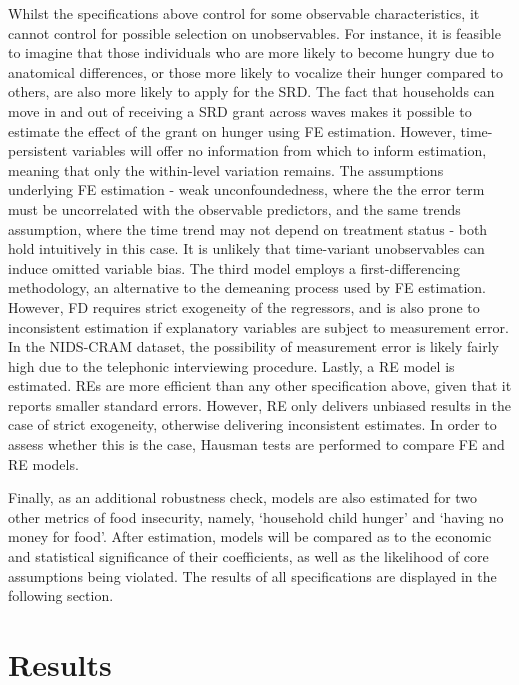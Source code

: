 \documentclass[11pt,preprint, authoryear]{elsarticle}
\numberwithin{equation}{section}
\numberwithin{figure}{section}
\numberwithin{table}{section}
\begin{document}
Whilst the specifications above control for some observable
characteristics, it cannot control for possible selection on
unobservables. For instance, it is feasible to imagine that those
individuals who are more likely to become hungry due to anatomical
differences, or those more likely to vocalize their hunger compared to
others, are also more likely to apply for the SRD. The fact that
households can move in and out of receiving a SRD grant across waves
makes it possible to estimate the effect of the grant on hunger using FE
estimation. However, time-persistent variables will offer no information
from which to inform estimation, meaning that only the within-level
variation remains. The assumptions underlying FE estimation - weak
unconfoundedness, where the the error term must be uncorrelated with the
observable predictors, and the same trends assumption, where the time
trend may not depend on treatment status - both hold intuitively in this
case. It is unlikely that time-variant unobservables can induce omitted
variable bias. The third model employs a first-differencing methodology,
an alternative to the demeaning process used by FE estimation. However,
FD requires strict exogeneity of the regressors, and is also prone to
inconsistent estimation if explanatory variables are subject to
measurement error. In the NIDS-CRAM dataset, the possibility of
measurement error is likely fairly high due to the telephonic
interviewing procedure. Lastly, a RE model is estimated. REs are more
efficient than any other specification above, given that it reports
smaller standard errors. However, RE only delivers unbiased results in
the case of strict exogeneity, otherwise delivering inconsistent
estimates. In order to assess whether this is the case, Hausman tests
are performed to compare FE and RE models.

Finally, as an additional robustness check, models are also estimated
for two other metrics of food insecurity, namely, `household child
hunger' and `having no money for food'. After estimation, models will be
compared as to the economic and statistical significance of their
coefficients, as well as the likelihood of core assumptions being
violated. The results of all specifications are displayed in the
following section.

\hypertarget{results}{%
\section{\texorpdfstring{Results
\label{Results}}{Results }}\label{results}}
\end{document}
